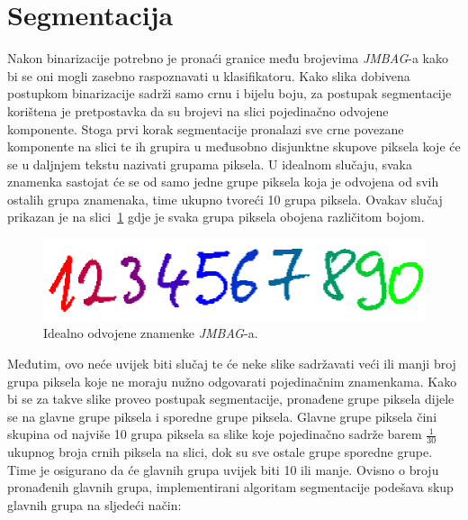 \section{Segmentacija}
\label{sec:segmentacija}
Nakon binarizacije potrebno je pronaći granice među brojevima \emph{JMBAG}-a kako bi se oni mogli zasebno raspoznavati
u klasifikatoru. Kako slika dobivena postupkom binarizacije sadrži samo crnu i bijelu boju, za postupak segmentacije
korištena je pretpostavka da su brojevi na slici pojedinačno odvojene komponente. Stoga prvi korak segmentacije
pronalazi sve crne povezane komponente na slici te ih grupira u međusobno disjunktne skupove piksela koje će se u
daljnjem tekstu nazivati grupama piksela. U idealnom slučaju, svaka znamenka sastojat će se od samo jedne grupe piksela
koja je odvojena od svih ostalih grupa znamenaka, time ukupno tvoreći 10 grupa piksela. Ovakav slučaj prikazan je na
slici\ \ref{fig:ideal-segmentation} gdje je svaka grupa piksela obojena različitom bojom.
\begin{figure}[htb]
    \centering
    \includegraphics[width=12cm]{images/chapter4/ideal-segmentation.png}
    \caption{Idealno odvojene znamenke \emph{JMBAG}-a.}
    \label{fig:ideal-segmentation}
\end{figure}
Međutim, ovo neće uvijek biti slučaj te će neke slike sadržavati veći ili manji broj grupa piksela koje ne moraju nužno
odgovarati pojedinačnim znamenkama. Kako bi se za takve slike proveo postupak segmentacije, pronađene grupe piksela
dijele se na glavne grupe piksela i sporedne grupe piksela. Glavne grupe piksela čini skupina od najviše 10 grupa
piksela sa slike koje pojedinačno sadrže barem $\frac{1}{30}$ ukupnog broja crnih piksela na slici, dok su sve ostale
grupe sporedne grupe. Time je osigurano da će glavnih grupa uvijek biti 10 ili manje. Ovisno o broju pronađenih glavnih
grupa, implementirani algoritam segmentacije podešava skup glavnih grupa na sljedeći način:
